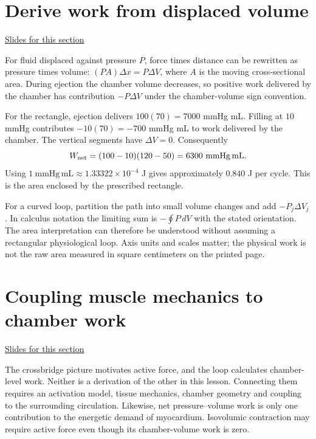 \documentclass[11pt,letterpaper]{article}
\theoremstyle{definition}\newtheorem{definition}{Definition}\newtheorem{example}{Example}
\numberwithin{equation}{section}
\begin{document}
\section{Derive work from displaced volume}
\hypertarget{note-derive-work-from-displaced-volume}{}\label{note:derive-work-from-displaced-volume}
{\small \href{slides.html\#frame=why-pressure-times-volume-is-work\&step=1}{Slides for this section}}\par
For fluid displaced against pressure $P$, force times distance can be rewritten as pressure times volume: $(P A)\Delta x=P\Delta V$, where $A$ is the moving cross-sectional area. During ejection the chamber volume decreases, so positive work delivered by the chamber has contribution $-P\Delta V$ under the chamber-volume sign convention.

For the rectangle, ejection delivers $100(70)=7000$ mmHg mL. Filling at $10$ mmHg contributes $-10(70)=-700$ mmHg mL to work delivered by the chamber. The vertical segments have $\Delta V=0$. Consequently
\begin{equation}
W_{\rm net}=(100-10)(120-50)=6300\ \mathrm{mmHg\,mL}.
\end{equation}
Using $1\ \mathrm{mmHg\,mL}\approx1.33322\times10^{-4}$ J gives approximately $0.840$ J per cycle. This is the area enclosed by the prescribed rectangle.

For a curved loop, partition the path into small volume changes and add $-P_j\Delta V_j$. In calculus notation the limiting sum is $-\oint P\,dV$ with the stated orientation. The area interpretation can therefore be understood without assuming a rectangular physiological loop. Axis units and scales matter; the physical work is not the raw area measured in square centimeters on the printed page.
\section{Coupling muscle mechanics to chamber work}
\hypertarget{note-coupling-muscle-mechanics-to-chamber-work}{}\label{note:coupling-muscle-mechanics-to-chamber-work}
{\small \href{slides.html\#frame=coupling-force-geometry-and-pressure\&step=1}{Slides for this section}}\par
The crossbridge picture motivates active force, and the loop calculates chamber-level work. Neither is a derivation of the other in this lesson. Connecting them requires an activation model, tissue mechanics, chamber geometry and coupling to the surrounding circulation. Likewise, net pressure--volume work is only one contribution to the energetic demand of myocardium. Isovolumic contraction may require active force even though its chamber-volume work is zero.
\end{document}
